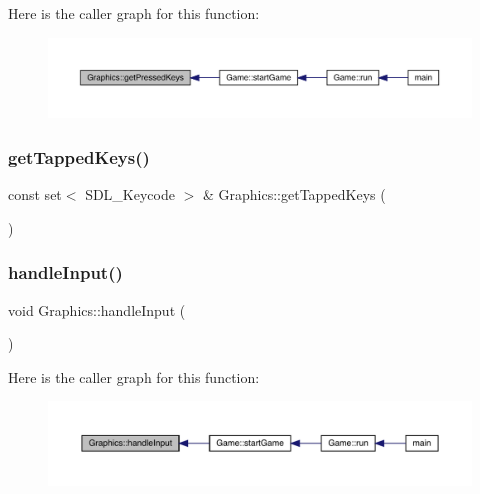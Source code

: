 Here is the caller graph for this function\+:\nopagebreak
\begin{figure}[H]
\begin{center}
\leavevmode
\includegraphics[width=350pt]{class_graphics_a772ed930cc5ae22dcdc35b4094bffbce_icgraph}
\end{center}
\end{figure}
\mbox{\label{class_graphics_a0444c93625b87614ed8a742d8833e5ad}} 
\subsubsection{\texorpdfstring{get\+Tapped\+Keys()}{getTappedKeys()}}
{\footnotesize\ttfamily const set$<$ S\+D\+L\+\_\+\+Keycode $>$ \& Graphics\+::get\+Tapped\+Keys (\begin{DoxyParamCaption}{ }\end{DoxyParamCaption})}

\mbox{\label{class_graphics_adff993cdcd0ed498c82cf7be87ead4f1}} 
\subsubsection{\texorpdfstring{handle\+Input()}{handleInput()}}
{\footnotesize\ttfamily void Graphics\+::handle\+Input (\begin{DoxyParamCaption}{ }\end{DoxyParamCaption})}

Here is the caller graph for this function\+:\nopagebreak
\begin{figure}[H]
\begin{center}
\leavevmode
\includegraphics[width=350pt]{class_graphics_adff993cdcd0ed498c82cf7be87ead4f1_icgraph}
\end{center}
\end{figure}
\mbox{\label{class_graphics_a64b5764b2dbef1b6df23ce18b1a918a1}} 
